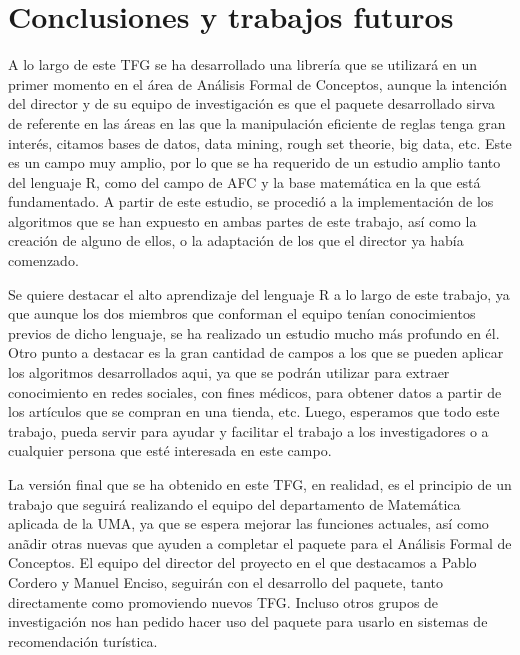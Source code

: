 \section{Conclusiones y trabajos futuros}
A lo largo de este TFG se ha desarrollado una librer\'ia que se utilizar\'a en un primer momento en el \'area de An\'alisis Formal de Conceptos, aunque la intenci\'on del director y de su equipo de investigaci\'on es que el paquete desarrollado sirva de referente en las \'areas en las que la manipulaci\'on eficiente de reglas tenga gran inter\'es, citamos bases de datos, data mining, rough set theorie, big data, etc. Este es un campo muy amplio, por lo que se ha requerido de un estudio amplio tanto del lenguaje R, como del campo de AFC y la base matem\'atica en la que est\'a fundamentado. A partir de este estudio, se procedi\'o a la implementaci\'on de los algoritmos que se han expuesto en ambas partes de este trabajo, as\'i como la creaci\'on de alguno de ellos, o la adaptaci\'on de los que el director ya hab\'ia comenzado.

Se quiere destacar el alto aprendizaje del lenguaje R a lo largo de este trabajo, ya que aunque los dos miembros que conforman el equipo ten\'ian conocimientos previos de dicho lenguaje, se ha realizado un estudio mucho m\'as profundo en \'el.
Otro punto a destacar es la gran cantidad de campos a los que se pueden aplicar los algoritmos desarrollados aqui, ya que se podr\'an utilizar para extraer conocimiento en redes sociales, con fines m\'edicos, para obtener datos a partir de los art\'iculos que se compran en una tienda, etc. Luego, esperamos que todo este trabajo, pueda servir para ayudar y facilitar el trabajo a los investigadores o a cualquier persona que est\'e interesada en este campo.

La versi\'on final que se ha obtenido en este TFG, en realidad, es el principio de un trabajo que seguir\'a realizando el equipo del departamento de Matem\'atica aplicada de la UMA, ya que se espera mejorar las funciones actuales, as\'i como an\~adir otras nuevas que ayuden a completar el paquete para el An\'alisis Formal de Conceptos. El equipo del director del proyecto en el que destacamos a Pablo Cordero y Manuel Enciso, seguir\'an con el desarrollo del paquete, tanto directamente como promoviendo nuevos TFG. Incluso otros grupos de investigaci\'on nos han pedido hacer uso del paquete para usarlo en sistemas de recomendaci\'on tur\'istica. 

\newpage